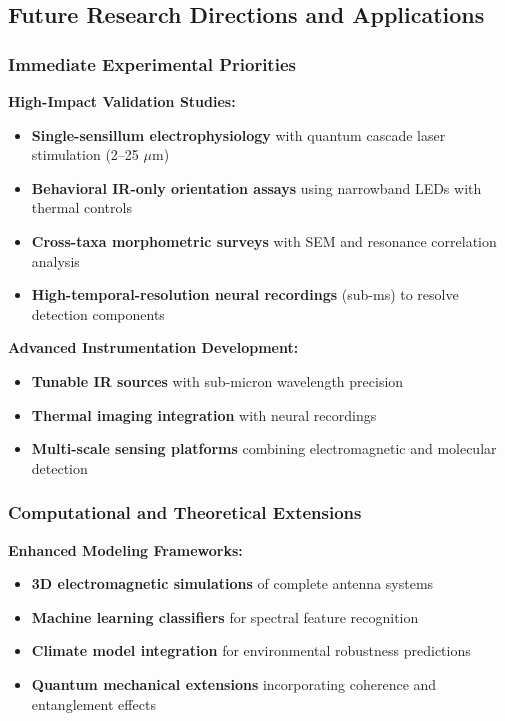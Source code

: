\documentclass[
  13pt,
  a4paperpaper,
  12pt]{article}
\providecommand{\tightlist}{%
  \setlength{\itemsep}{0pt}\setlength{\parskip}{0pt}}
\begin{document}
\subsection{Future Research Directions and
Applications}\label{future-research-directions-and-applications}

\subsubsection{Immediate Experimental
Priorities}\label{immediate-experimental-priorities}

\textbf{High-Impact Validation Studies:}

\begin{itemize}
\tightlist
\item
  \textbf{Single-sensillum electrophysiology} with quantum cascade laser
  stimulation (2--25 \(\mu\mathrm{m}\))
\item
  \textbf{Behavioral IR-only orientation assays} using narrowband LEDs
  with thermal controls
\item
  \textbf{Cross-taxa morphometric surveys} with SEM and resonance
  correlation analysis
\item
  \textbf{High-temporal-resolution neural recordings} (sub-ms) to
  resolve detection components
\end{itemize}

\textbf{Advanced Instrumentation Development:}

\begin{itemize}
\tightlist
\item
  \textbf{Tunable IR sources} with sub-micron wavelength precision
\item
  \textbf{Thermal imaging integration} with neural recordings
\item
  \textbf{Multi-scale sensing platforms} combining electromagnetic and
  molecular detection
\end{itemize}

\subsubsection{Computational and Theoretical
Extensions}\label{computational-and-theoretical-extensions}

\textbf{Enhanced Modeling Frameworks:}

\begin{itemize}
\tightlist
\item
  \textbf{3D electromagnetic simulations} of complete antenna systems
\item
  \textbf{Machine learning classifiers} for spectral feature recognition
\item
  \textbf{Climate model integration} for environmental robustness
  predictions
\item
  \textbf{Quantum mechanical extensions} incorporating coherence and
  entanglement effects
\end{itemize}
\end{document}
